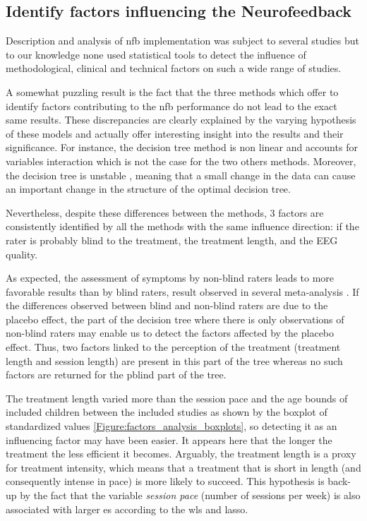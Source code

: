 
\subsection{Identify factors influencing the Neurofeedback}

Description and analysis of \gls{nfb} implementation was subject to several studies \citep{Arns2014, Enriquez2017, Vernon2004} 
but to our knowledge none used statistical tools to detect the influence of methodological, clinical and technical factors 
on such a wide range of studies. 

A somewhat puzzling result is the fact that the three methods which offer to identify factors contributing to the \gls{nfb} 
performance do not lead to the exact same results. These discrepancies are clearly explained by the varying hypothesis 
of these models and actually offer interesting insight into the results and their significance. For instance, the decision tree method is non 
linear and accounts for variables interaction which is not the case for the two others methods. Moreover, the decision tree is unstable 
\citep{dwyer2007}, meaning that a small change in the data can cause an important change in the structure of the optimal decision tree.

Nevertheless, despite these differences between the methods, 3 factors are consistently identified by all the methods with 
the same influence direction: if the rater is probably blind to the treatment, the treatment length, and the EEG quality. 

As expected, the assessment of symptoms by non-blind raters leads to more favorable results than by blind raters, 
result observed in several meta-analysis  \citep{Cortese2016, Micoulaud2014}. If the differences observed between blind 
and non-blind raters are due to the placebo effect, the part of the decision tree where there is only observations of 
non-blind raters may enable us to detect the factors affected by the placebo effect. 
Thus, two factors linked to the perception of the treatment (treatment length and session length)
are present in this part of the tree whereas no such factors are returned for 
the \gls{pblind} part of the tree.

The treatment length varied more than the session pace and the age bounds of included children between the included studies as shown 
by the boxplot of standardized values \cref{Figure:factors_analysis_boxplots}, so detecting it as an influencing factor may have 
been easier. It appears here that the longer the treatment the less efficient it becomes. Arguably, the treatment length is a proxy 
for treatment intensity, which means that a treatment that is short in length (and consequently intense in pace) 
is more likely to succeed. This hypothesis is back-up by the fact that the variable \emph{session pace} (number of sessions per week) 
is also associated with larger \gls{es} according to the \gls{wls} and \gls{lasso}. 

